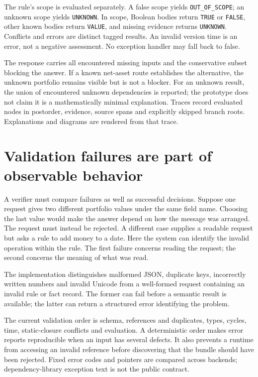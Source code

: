 
The rule's scope is evaluated separately. A false scope yields
\texttt{OUT\_OF\_SCOPE}; an unknown scope yields \texttt{UNKNOWN}. In scope,
Boolean bodies return \texttt{TRUE} or \texttt{FALSE}, other known bodies return
\texttt{VALUE}, and missing evidence returns \texttt{UNKNOWN}. Conflicts and
errors are distinct tagged results. An invalid version time is an error, not a
negative assessment. No exception handler may fall back to false.

The response carries all encountered missing inputs and the conservative subset
blocking the answer. If a known net-asset route establishes the alternative,
the unknown portfolio remains visible but is not a blocker. For an unknown
result, the union of encountered unknown dependencies is reported; the prototype
does not claim it is a mathematically minimal explanation. Traces record evaluated
nodes in postorder, evidence, source spans and explicitly skipped branch roots.
Explanations and diagrams are rendered from that trace.

\section{Validation failures are part of observable behavior}
\label{merge:M07:04}


A verifier must compare failures as well as successful decisions. Suppose one
request gives two different portfolio values under the same field name. Choosing
the last value would make the answer depend on how the message was arranged.
The request must instead be rejected. A different case supplies a readable
request but asks a rule to add money to a date. Here the system can identify the
invalid operation within the rule. The first failure concerns reading the
request; the second concerns the meaning of what was read.

The implementation distinguishes malformed JSON, duplicate keys, incorrectly
written numbers and invalid Unicode from a well-formed request containing an
invalid rule or fact record. The former can fail before a semantic result is
available; the latter can return a structured error identifying the problem.

The current validation order is schema, references and duplicates, types, cycles,
time, static-closure conflicts and evaluation. A deterministic order makes error
reports reproducible when an input has several defects. It also prevents a
runtime from accessing an invalid reference before discovering that the bundle
should have been rejected. Fixed error codes and pointers are compared across
backends; dependency-library exception text is not the public contract.

